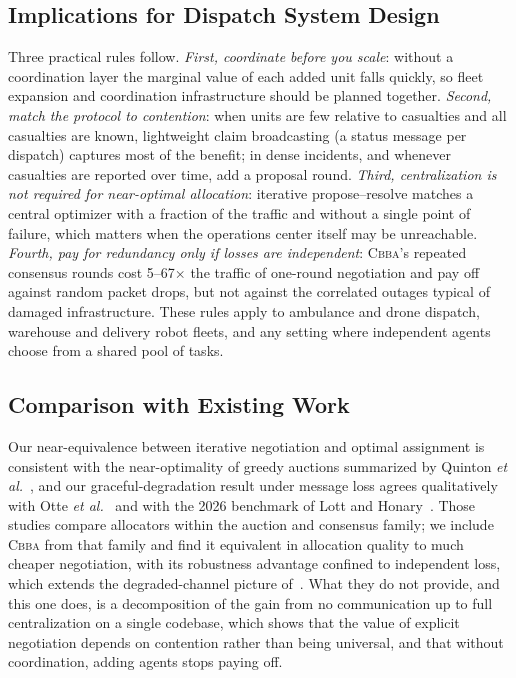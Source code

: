 \documentclass[conference]{IEEEtran}
\newcommand{\CBBA}{\textsc{Cbba}}
\begin{document}
\subsection{Implications for Dispatch System Design}
Three practical rules follow. \emph{First, coordinate before you scale}: without a coordination layer the marginal value of each added unit falls quickly, so fleet expansion and coordination infrastructure should be planned together. \emph{Second, match the protocol to contention}: when units are few relative to casualties and all casualties are known, lightweight claim broadcasting (a status message per dispatch) captures most of the benefit; in dense incidents, and whenever casualties are reported over time, add a proposal round. \emph{Third, centralization is not required for near-optimal allocation}: iterative propose--resolve matches a central optimizer with a fraction of the traffic and without a single point of failure, which matters when the operations center itself may be unreachable. \emph{Fourth, pay for redundancy only if losses are independent}: \CBBA{}'s repeated consensus rounds cost 5--67$\times$ the traffic of one-round negotiation and pay off against random packet drops, but not against the correlated outages typical of damaged infrastructure. These rules apply to ambulance and drone dispatch, warehouse and delivery robot fleets, and any setting where independent agents choose from a shared pool of tasks.

\subsection{Comparison with Existing Work}
Our near-equivalence between iterative negotiation and optimal assignment is consistent with the near-optimality of greedy auctions summarized by Quinton \emph{et al.}~\cite{quinton2023}, and our graceful-degradation result under message loss agrees qualitatively with Otte \emph{et al.}~\cite{otte2020} and with the 2026 benchmark of Lott and Honary~\cite{lott2026}. Those studies compare allocators within the auction and consensus family; we include \CBBA{} from that family and find it equivalent in allocation quality to much cheaper negotiation, with its robustness advantage confined to independent loss, which extends the degraded-channel picture of~\cite{lott2026}. What they do not provide, and this one does, is a decomposition of the gain from no communication up to full centralization on a single codebase, which shows that the value of explicit negotiation depends on contention rather than being universal, and that without coordination, adding agents stops paying off.
\end{document}
